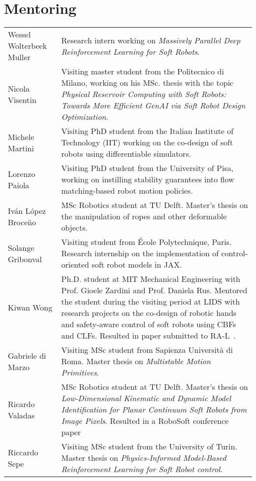 \section*{Mentoring}
\noindent
\begin{longtable}{p{} p{}}
    Wessel Wolterbeek Muller & Research intern working on \emph{Massively Parallel Deep Reinforcement Learning for Soft Robots}.\\
    Nicola Visentin & Visiting master student from the Politecnico di Milano, working on his MSc. thesis with the topic \emph{Physical Reservoir Computing with Soft Robots: Towards More Efficient GenAI via Soft Robot Design Optimization}.\\
    Michele Martini & Visiting PhD student from the Italian Institute of Technology (IIT) working on the co-design of soft robots using differentiable simulators.\\
    Lorenzo Paiola & Visiting PhD student from the University of Pisa, working on instilling stability guarantees into flow matching-based robot motion policies.\\
    Iván López Broceño & MSc Robotics student at TU Delft. Master's thesis on the manipulation of ropes and other deformable objects.\\
    Solange Gribonval & Visiting student from École Polytechnique, Paris. Research internship on the implementation of control-oriented soft robot models in JAX.\\
    Kiwan Wong & Ph.D. student at MIT Mechanical Engineering with Prof. Gioele Zardini and Prof. Daniela Rus. Mentored the student during the visiting period at LIDS with research projects on the co-design of robotic hands and safety-aware control of soft robots using \glspl{CBF} and \glspl{CLF}. Resulted in paper submitted to RA-L~\citep{wong2025contact}.\\
    Gabriele di Marzo & Visiting MSc student from Sapienza Università di Roma. Master thesis on \emph{Multistable Motion Primitives}.\\
    Ricardo Valadas & MSc Robotics student at TU Delft. Master's thesis on \emph{Low-Dimensional Kinematic and Dynamic Model Identification for Planar Continuum Soft Robots from Image Pixels}. Resulted in a RoboSoft conference paper~\citep{valadas2025learning}\\
    Riccardo Sepe & Visiting MSc student from the University of Turin. Master thesis on \emph{Physics-Informed Model-Based Reinforcement Learning for Soft Robot control}.\\

\end{longtable}
